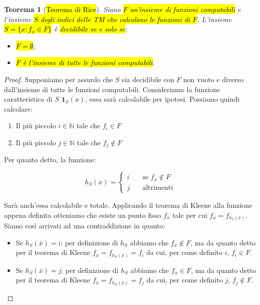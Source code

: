 \documentclass[a4paper,11pt,twoside]{article}
\theoremstyle{plain}
\newtheorem{thm}{Teorema}[section]
\theoremstyle{definition}
\theoremstyle{remark}
\begin{document}
\begin{thm}[\hl{Teorema di Rice}]\label{thm:rice}
  Siano \hl{$F$ un'insieme di funzioni computabili} e l'insieme \hl{$S$ degli
  indici delle TM che calcolano le funzioni di $F$}. L'insieme \hl{$S = \{x:f_x
  \in F\}$} è \hl{decidibile se e solo se}:

  \begin{itemize}
    \item \hl{$F = \emptyset$};
    \item \hl{$F$ è l'insieme di tutte le funzioni computabili}.
  \end{itemize}
\end{thm}
\begin{proof}
  Supponiamo per assurdo che $S$ sia decidibile con $F$ non vuoto e diverso
  dall'insieme di tutte le funzioni computabili. Consideriamo la funzione
  caratteristica di $S$ $\mathbf{1}_S(x)$, essa sarà calcolabile per ipotesi.
  Possiamo quindi calcolare:

  \begin{enumerate}
    \item Il più piccolo $i \in \mathbb{N}$ tale che $f_i \in F$
    \item Il più piccolo $j \in \mathbb{N}$ tale che $f_j \notin F$
  \end{enumerate}

  Per quanto detto, la funzione:

  \[
    h_S(x) =
    \begin{cases}
      i & \quad \text{se } f_x \notin F \\
      j & \quad \text{altrimenti}
    \end{cases}
  \]

  Sarà anch'essa calcolabile e totale. Applicando il teorema di Kleene alla
  funzione appena definita otteniamo che esiste un punto fisso $f_{\bar{x}}$ tale
  per cui $f_{\bar{x}} = f_{h_s(\bar{x})}$. Siamo così arrivati ad una
  contraddizione in quanto:

  \begin{itemize}
    \item Se $h_S(\bar{x}) = i$: per definizione di $h_S$ abbiamo che
      $f_{\bar{x}} \notin F$, ma da quanto detto per il teorema di Kleene
      $f_{\bar{x}} = f_{h_S(\bar{x})} = f_i$ da cui, per come definito $i$, $f_i
      \in F$.
    \item Se $h_S(\bar{x}) = j$: per definizione di $h_S$ abbiamo che
      $f_{\bar{x}} \in F$, ma da quanto detto per il teorema di Kleene
      $f_{\bar{x}} = f_{h_S(\bar{x})} = f_j$ da cui, per come definito $j$, $f_j
      \notin F$.
  \end{itemize}
\end{proof}
\end{document}
